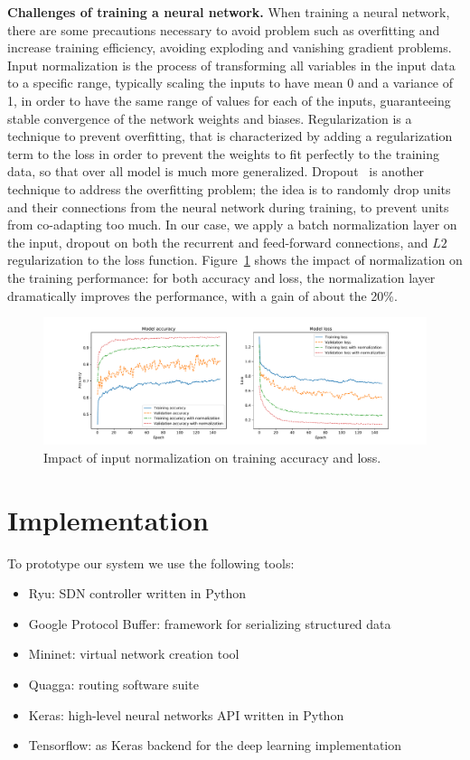 \noindent
{\bf Challenges of training a neural network.}
When training a neural network, there are some precautions necessary to avoid problem such as overfitting and increase training efficiency, avoiding exploding and vanishing gradient problems. Input normalization is the process of transforming all variables in the input data to a specific range, typically scaling the inputs to have mean 0 and a variance of 1, in order to have the same range of values for each of the inputs, guaranteeing stable convergence of the network weights and biases. Regularization is a technique to prevent overfitting, that  is characterized by adding a regularization term to the loss in order to prevent the weights to fit perfectly to the training data,  so that over all model is much more generalized. Dropout~\cite{srivastava2014dropout} is another technique to address the overfitting problem; the idea is to randomly drop units and their connections from the neural network during training, to prevent units from co-adapting too much.
In our case, we apply a batch normalization layer on the input, dropout on both the recurrent and feed-forward connections, and $L2$ regularization to the loss function. Figure~\ref{fig:normalization_cmp} shows the impact of normalization on the training performance: for both accuracy and loss, the normalization layer dramatically improves the performance, with a gain of about the 20\%.

\begin{figure}[]
\centering
\includegraphics[width=\textwidth]{img/normalization_cmp}
\caption{Impact of input normalization on training accuracy and loss.}
\label{fig:normalization_cmp}
\end{figure}

\section{Implementation}
\label{sec:implementation}
To prototype our system we use the following tools:
\begin{itemize}
\item Ryu: SDN controller written in Python~\cite{ryu}
\item Google Protocol Buffer: framework for serializing structured data~\cite{protobuf}
\item Mininet: virtual network creation tool~\cite{mininet}
\item Quagga: routing software suite~\cite{quagga}
\item Keras: high-level neural networks API written in Python~\cite{keras}
\item Tensorflow: as Keras backend for the deep learning implementation~\cite{tensorflow}
\end{itemize}